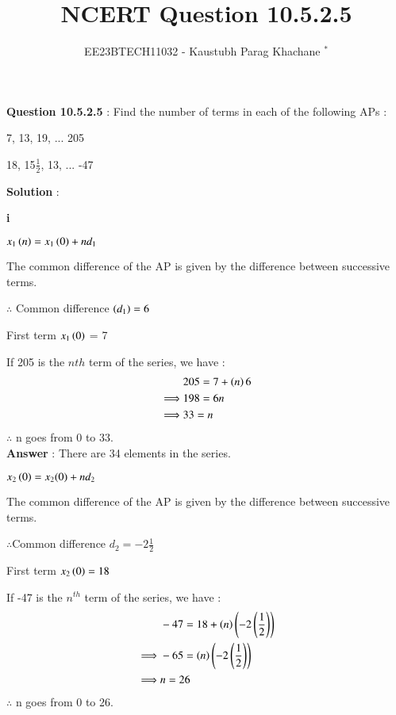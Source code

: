 \documentclass[journal,12pt,twocolumn]{IEEEtran}
\theoremstyle{remark}
\begin{document}

\vspace{3cm}

\Large\title{NCERT Question 10.5.2.5}
\large\author{EE23BTECH11032 - Kaustubh Parag Khachane $^{*}$%
}
\maketitle
\newpage
\bigskip

\renewcommand{\thefigure}{\theenumi}
\renewcommand{\thetable}{\theenumi}
\large\textbf{Question 10.5.2.5} : \normalsize Find the number of terms in each of the following APs : 

 7, 13, 19, ... 205

 18, 15$\frac{1}{2}$, 13, ... -47

\vspace{4mm} 

\large\textbf{Solution} :\normalsize
\vspace{4mm}

\textbf{\brak i} 

$x_{1}\left(n\right) = x_{1}\left(0\right) + nd_{1}$

The common difference of the AP is given by the difference between successive terms.

$\therefore$ Common difference $\left(d_{1}\right) = 6$

First term $x_{1}\left(0\right)$ = 7

If 205 is the $n{th}$ term of the series, we have :
\begin{align}
&205 = 7 + \left(n\right)6\\ 
\implies&  198 = 6n\\
\implies&  33 = n
\end{align}
$\therefore$ n goes from 0 to 33.\\
\large\textbf{Answer} : \normalsize There are 34 elements in the series.

\vspace{4mm}

\textbf{} 

$x_{2}\left(0\right) = x_{2}(0) + nd_{2}$

The common difference of the AP is given by the difference between successive terms.

$\therefore$Common difference $d_{2} = -2\frac{1}{2}$

First term $x_{2}\left(0\right) = 18$

If -47 is the $n^{th}$ term of the series, we have :
\begin{align}
&-47 = 18 + \left(n\right)\left(-2\left(\frac{1}{2}\right)\right)\\ 
\implies& -65 = \left(n\right)\left(-2\left(\frac{1}{2}\right)\right)\\
\implies& n = 26
\end{align} 
$\therefore$ n goes from 0 to 26.
\end{document}
